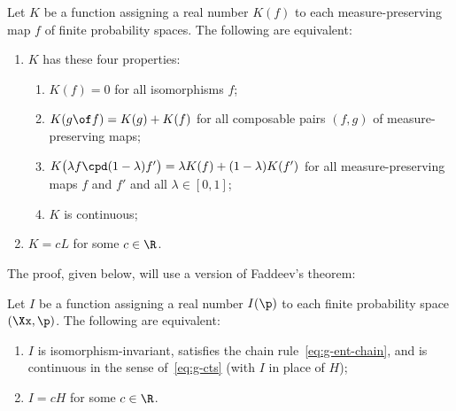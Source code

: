 \begin{thm}
%
%
%
%
%
Let $K$ be a function assigning a real number $K(f)$ to each
measure-preserving map $f$ of finite probability spaces.  The following
are equivalent:
% 
\begin{enumerate}
\item 
{}
$K$ has these four properties:
% 
\begin{enumerate}
\item 
$K(f) = 0$ for all isomorphisms $f$;

\item
$K(g \of f) = K(g) + K(f)$ for all composable pairs $(f, g)$ of
  measure-preserving maps;

\item
$K\bigl(\lambda f \cpd (1 - \lambda) f'\bigr) = \lambda K(f) + (1 -
  \lambda) K(f')$ for all measure-preserving maps $f$ and $f'$ and all
  $\lambda \in [0, 1]$;

\item
$K$ is continuous;
\end{enumerate}

\item
{}
$K = cL$ for some $c \in \R$.
\end{enumerate}
\end{thm}

The proof, given below, will use a version of Faddeev's theorem:

\begin{thm}
%
%
%
Let $I$ be a function assigning a real number $I(\p)$ to each finite
probability space $(\Xx, \p)$.  The following are equivalent:
% 
\begin{enumerate}
\item
{}
$I$ is isomorphism-invariant, satisfies the chain
rule~\eqref{eq:g-ent-chain}, and is continuous in the sense
of~\eqref{eq:g-cts} (with $I$ in place of $H$); 

\item
{}
$I = cH$ for some $c \in \R$.
\end{enumerate}
\end{thm}

